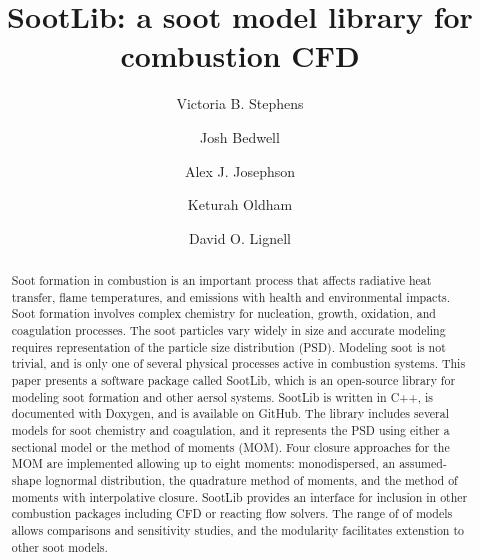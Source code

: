 \documentclass[preprint,letterpaper]{elsarticle}
\begin{document}
\begin{frontmatter}



\title{SootLib: a soot model library for combustion CFD}


\author{Victoria B. Stephens}
\author{Josh Bedwell}
\author{Alex J. Josephson}
\author{Keturah Oldham}
\author{David O. Lignell}


\address{Chemical Engineering Department, Brigham Young University, Provo, UT 84602, USA}

\begin{abstract}
%
Soot formation in combustion is an important process that affects radiative heat transfer, flame temperatures, and emissions with health and environmental impacts. Soot formation involves complex chemistry for nucleation, growth, oxidation, and coagulation processes. The soot particles vary widely in size and accurate modeling requires representation of the particle size distribution (PSD). Modeling soot is not trivial, and is only one of several physical processes active in combustion systems. This paper presents a software package called SootLib, which is an open-source library for modeling soot formation and other aersol systems. SootLib is written in C++, is documented with Doxygen, and is available on GitHub. The library includes several models for soot chemistry and coagulation, and it represents the PSD using either a sectional model or the method of moments (MOM). Four closure approaches for the MOM are implemented allowing up to eight moments: monodispersed, an assumed-shape lognormal distribution, the quadrature method of moments, and the method of moments with interpolative closure. SootLib provides an interface for inclusion in other combustion packages including CFD or reacting flow solvers. The range of of models allows comparisons and sensitivity studies, and the modularity facilitates extenstion to other soot models.
%
\end{abstract}


\end{frontmatter}
\end{document}
